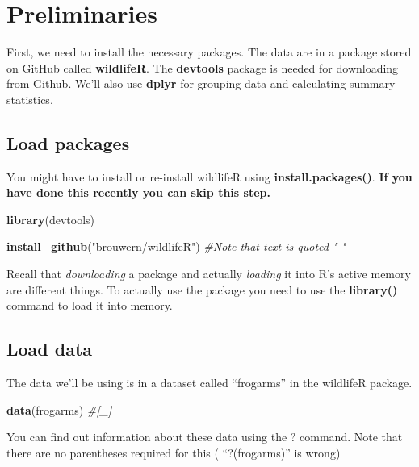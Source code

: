 \documentclass[]{book}
\newenvironment{Shaded}{\begin{snugshade}}{\end{snugshade}}
\newcommand{\KeywordTok}[1]{\textcolor[rgb]{0.13,0.29,0.53}{\textbf{#1}}}
\newcommand{\StringTok}[1]{\textcolor[rgb]{0.31,0.60,0.02}{#1}}
\newcommand{\CommentTok}[1]{\textcolor[rgb]{0.56,0.35,0.01}{\textit{#1}}}
\newcommand{\NormalTok}[1]{#1}
\theoremstyle{definition}
\theoremstyle{definition}
\theoremstyle{definition}
\theoremstyle{remark}
\begin{document}
\section{Preliminaries}\label{preliminaries-1}

First, we need to install the necessary packages. The data are in a
package stored on GitHub called \textbf{wildlifeR}. The
\textbf{devtools} package is needed for downloading from Github. We'll
also use \textbf{dplyr} for grouping data and calculating summary
statistics.

\subsection{Load packages}\label{load-packages}

You might have to install or re-install wildlifeR using
\textbf{install.packages()}. \textbf{If you have done this recently you
can skip this step.}

\begin{Shaded}
\begin{Highlighting}[]
\KeywordTok{library}\NormalTok{(devtools)}

\KeywordTok{install_github}\NormalTok{(}\StringTok{"brouwern/wildlifeR"}\NormalTok{) }\CommentTok{#Note that text is quoted " "}
\end{Highlighting}
\end{Shaded}

Recall that \emph{downloading} a package and actually \emph{loading} it
into R's active memory are different things. To actually use the package
you need to use the \textbf{library()} command to load it into memory.

\subsection{Load data}\label{load-data}

The data we'll be using is in a dataset called ``frogarms'' in the
wildlifeR package.

\begin{Shaded}
\begin{Highlighting}[]
\KeywordTok{data}\NormalTok{(frogarms) }\CommentTok{#[_]}
\end{Highlighting}
\end{Shaded}

You can find out information about these data using the ? command. Note
that there are no parentheses required for this ( ``?(frogarms)'' is
wrong)
\end{document}
